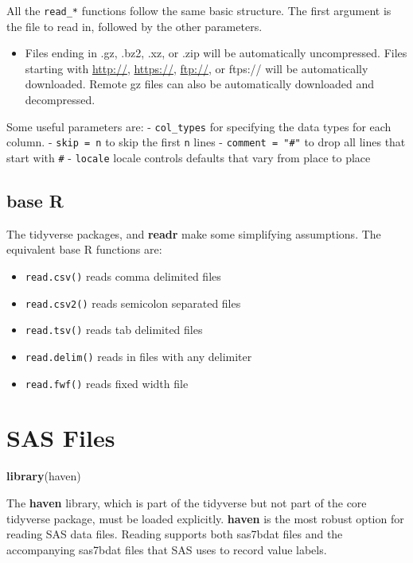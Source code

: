 \documentclass[]{book}
\newenvironment{Shaded}{\begin{snugshade}}{\end{snugshade}}
\newcommand{\KeywordTok}[1]{\textcolor[rgb]{0.13,0.29,0.53}{\textbf{#1}}}
\newcommand{\NormalTok}[1]{#1}
\providecommand{\tightlist}{%
  \setlength{\itemsep}{0pt}\setlength{\parskip}{0pt}}
\newenvironment{rmdblock}[1]
  {\begin{shaded*}
  \begin{itemize}
  \renewcommand{\labelitemi}{
    \raisebox{-.7\height}[0pt][0pt]{
      {\setkeys{Gin}{width=3em,keepaspectratio}\texttt{[image: images/\#1]}}
    }
  }
  \item
  }
  {
  \end{itemize}
  \end{shaded*}
  }
\newenvironment{rmdnote}
  {\begin{rmdblock}{note}}
  {\end{rmdblock}}
\theoremstyle{definition}
\theoremstyle{definition}
\theoremstyle{definition}
\theoremstyle{remark}
\begin{document}
All the \texttt{read\_*} functions follow the same basic structure. The
first argument is the file to read in, followed by the other parameters.

\begin{rmdnote}
Files ending in .gz, .bz2, .xz, or .zip will be automatically
uncompressed. Files starting with \url{http://}, \url{https://},
\url{ftp://}, or ftps:// will be automatically downloaded. Remote gz
files can also be automatically downloaded and decompressed.
\end{rmdnote}

Some useful parameters are: - \texttt{col\_types} for specifying the
data types for each column. - \texttt{skip\ =\ n} to skip the first
\texttt{n} lines - \texttt{comment\ =\ "\#"} to drop all lines that
start with \texttt{\#} - \texttt{locale} locale controls defaults that
vary from place to place

\hypertarget{base-r}{%
\subsection{base R}\label{base-r}}

The tidyverse packages, and \textbf{readr} make some simplifying
assumptions. The equivalent base R functions are:

\begin{itemize}
\tightlist
\item
  \texttt{read.csv()} reads comma delimited files
\item
  \texttt{read.csv2()} reads semicolon separated files
\item
  \texttt{read.tsv()} reads tab delimited files
\item
  \texttt{read.delim()} reads in files with any delimiter
\item
  \texttt{read.fwf()} reads fixed width file
\end{itemize}

\hypertarget{sas-files}{%
\section{SAS Files}\label{sas-files}}

\begin{Shaded}
\begin{Highlighting}[]
\KeywordTok{library}\NormalTok{(haven)}
\end{Highlighting}
\end{Shaded}

The \textbf{haven} library, which is part of the tidyverse but not part
of the core tidyverse package, must be loaded explicitly. \textbf{haven}
is the most robust option for reading SAS data files. Reading supports
both sas7bdat files and the accompanying sas7bdat files that SAS uses to
record value labels.
\end{document}
